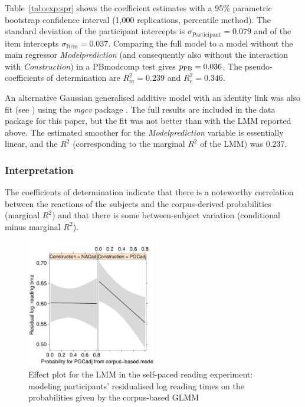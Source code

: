 Table~\ref{tab:exp:spr} shows the coefficient estimates with a 95\% parametric bootstrap confidence interval (1,000 replications, percentile method).
The standard deviation of the participant intercepts is $\sigma_{\text{Participant}}=0.079$ and of the item intercepts $\sigma_{\text{Item}}=0.037$.
Comparing the full model to a model without the main regressor \textit{Modelprediction} (and consequently also without the interaction with \textit{Construction}) in a PBmodcomp test gives $p_{\text{PB}}=0.036$.
The pseudo-coefficients of determination are $R^2_m=0.239$ and $R^2_c=0.346$.

An alternative Gaussian generalised additive model with an identity link was also fit (see \citealp{DivjakEa2016}) using the \textit{mgcv} package \citep{Wood2011}.
The full results are included in the data package for this paper, but the fit was not better than with the LMM reported above.
The estimated smoother for the \textit{Modelprediction} variable is essentially linear, and the $R^2$ (corresponding to the marginal $R^2$ of the LMM) was 0.237.

\subsubsection{Interpretation}

The coefficients of determination indicate that there is a noteworthy correlation between the reactions of the subjects and the corpus-derived probabilities (marginal $R^2$) and that there is some between-subject variation (conditional minus marginal $R^2$).

\begin{figure}[htbp!]
\centering
\includegraphics[width=0.5\textwidth]{../R/output/spr_effects}
\caption{Effect plot for the LMM in the self-paced reading experiment: modeling participants' residualised log reading times on the probabilities given by the corpus-based GLMM}
\label{fig:spr:effects}
\end{figure}

